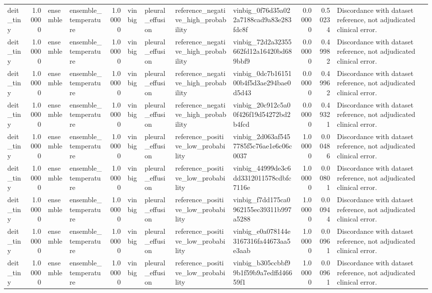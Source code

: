 \begin{tabular}{lrllrllllrrl}
deit\_tiny & 1.00000 & ensemble & ensemble\_temperature & 1.00000 & vinbig & pleural\_effusion & reference\_negative\_high\_probability & vinbig\_0f76d35a022a7188cad9a83e283fdc8f & 0.00000 & 0.50234 & Discordance with dataset reference, not adjudicated clinical error. \\
deit\_tiny & 1.00000 & ensemble & ensemble\_temperature & 1.00000 & vinbig & pleural\_effusion & reference\_negative\_high\_probability & vinbig\_72d2a32355662fd12a16420bd689bbf9 & 0.00000 & 0.49982 & Discordance with dataset reference, not adjudicated clinical error. \\
deit\_tiny & 1.00000 & ensemble & ensemble\_temperature & 1.00000 & vinbig & pleural\_effusion & reference\_negative\_high\_probability & vinbig\_0dc7b1615100b4f5d3ae294bae0d5d43 & 0.00000 & 0.49962 & Discordance with dataset reference, not adjudicated clinical error. \\
deit\_tiny & 1.00000 & ensemble & ensemble\_temperature & 1.00000 & vinbig & pleural\_effusion & reference\_negative\_high\_probability & vinbig\_20c912c5a00f426f19d54272bd2b4fcd & 0.00000 & 0.49321 & Discordance with dataset reference, not adjudicated clinical error. \\
deit\_tiny & 1.00000 & ensemble & ensemble\_temperature & 1.00000 & vinbig & pleural\_effusion & reference\_positive\_low\_probability & vinbig\_2d063af5457785f5c76ae1e6c06c0037 & 1.00000 & 0.00486 & Discordance with dataset reference, not adjudicated clinical error. \\
deit\_tiny & 1.00000 & ensemble & ensemble\_temperature & 1.00000 & vinbig & pleural\_effusion & reference\_positive\_low\_probability & vinbig\_44999de3c6dd3312011578cdbfc7116e & 1.00000 & 0.00801 & Discordance with dataset reference, not adjudicated clinical error. \\
deit\_tiny & 1.00000 & ensemble & ensemble\_temperature & 1.00000 & vinbig & pleural\_effusion & reference\_positive\_low\_probability & vinbig\_f7dd175ca0962155ec39311b997a5288 & 1.00000 & 0.00944 & Discordance with dataset reference, not adjudicated clinical error. \\
deit\_tiny & 1.00000 & ensemble & ensemble\_temperature & 1.00000 & vinbig & pleural\_effusion & reference\_positive\_low\_probability & vinbig\_e0a078144e3167316fa44673aa5e3aab & 1.00000 & 0.00961 & Discordance with dataset reference, not adjudicated clinical error. \\
deit\_tiny & 1.00000 & ensemble & ensemble\_temperature & 1.00000 & vinbig & pleural\_effusion & reference\_positive\_low\_probability & vinbig\_b305ccbbf99b1f59b9a7edffd46659f1 & 1.00000 & 0.00961 & Discordance with dataset reference, not adjudicated clinical error. \\

\end{tabular}
